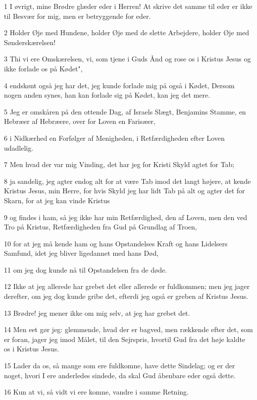 \par 1 I øvrigt, mine Brødre glæder eder i Herren! At skrive det samme til eder er ikke til Besvær for mig, men er betryggende for eder.
\par 2 Holder Øje med Hundene, holder Øje med de slette Arbejdere, holder Øje med Sønderskærelsen!
\par 3 Thi vi ere Omskærelsen, vi, som tjene i Guds Ånd og rose os i Kristus Jesus og ikke forlade os på Kødet",
\par 4 endskønt også jeg har det, jeg kunde forlade mig på også i Kødet, Dersom nogen anden synes, han kan forlade sig på Kødet, kan jeg det mere.
\par 5 Jeg er omskåren på den ottende Dag, af Israels Slægt, Benjamins Stamme, en Hebræer af Hebræere, over for Loven en Farisæer,
\par 6 i Nidkærhed en Forfølger af Menigheden, i Retfærdigheden efter Loven udadlelig.
\par 7 Men hvad der var mig Vinding, det har jeg for Kristi Skyld agtet for Tab;
\par 8 ja sandelig, jeg agter endog alt for at være Tab imod det langt højere, at kende Kristus Jesus, min Herre, for hvis Skyld jeg har lidt Tab på alt og agter det for Skarn, for at jeg kan vinde Kristus
\par 9 og findes i ham, så jeg ikke har min Retfærdighed, den af Loven, men den ved Tro på Kristus, Retfærdigheden fra Gud på Grundlag af Troen,
\par 10 for at jeg må kende ham og hans Opstandelses Kraft og hans Lidelsers Samfund, idet jeg bliver ligedannet med hans Død,
\par 11 om jeg dog kunde nå til Opstandelsen fra de døde.
\par 12 Ikke at jeg allerede har grebet det eller allerede er fuldkommen; men jeg jager derefter, om jeg dog kunde gribe det, efterdi jeg også er greben af Kristus Jesus.
\par 13 Brødre! jeg mener ikke om mig selv, at jeg har grebet det.
\par 14 Men eet gør jeg: glemmende, hvad der er bagved, men rækkende efter det, som er foran, jager jeg imod Målet, til den Sejrspris, hvortil Gud fra det høje kaldte os i Kristus Jesus.
\par 15 Lader da os, så mange som ere fuldkomne, have dette Sindelag; og er der noget, hvori I ere anderledes sindede, da skal Gud åbenbare eder også dette.
\par 16 Kun at vi, så vidt vi ere komne, vandre i samme Retning.
